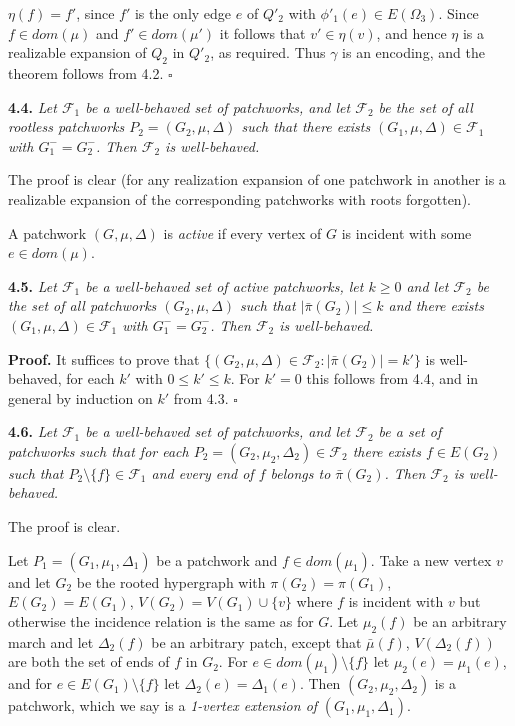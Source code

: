 \noindent $\eta(f) = f'$, since $f'$ is the only edge $e$ of $Q'_2$ with $\phi'_1(e) \in E(\Omega_3)$. Since $f \in dom(\mu)$ and $f' \in dom(\mu')$ it follows that $v' \in \eta(v)$, and hence $\eta$ is a realizable expansion of $Q_2$ in $Q'_2$, as required. Thus $\gamma$ is an encoding, and the theorem follows from 4.2. $\square$

\textbf{4.4.} \textit{Let $\mathcal{F}_1$ be a well-behaved set of patchworks, and let $\mathcal{F}_2$ be the set of all rootless patchworks $P_2 = (G_2, \mu, \Delta)$ such that there exists $(G_1, \mu, \Delta) \in \mathcal{F}_1$ with $G_1^- = G_2^-$. Then $\mathcal{F}_2$ is well-behaved.}

The proof is clear (for any realization expansion of one patchwork in another is a realizable expansion of the corresponding patchworks with roots forgotten).

A patchwork $(G, \mu, \Delta)$ is \textit{active} if every vertex of $G$ is incident with some $e \in dom(\mu)$.

\textbf{4.5.} \textit{Let $\mathcal{F}_1$ be a well-behaved set of active patchworks, let $k \ge 0$ and let $\mathcal{F}_2$ be the set of all patchworks $(G_2, \mu, \Delta)$ such that $|\bar{\pi}(G_2)| \le k$ and there exists $(G_1, \mu, \Delta) \in \mathcal{F}_1$ with $G_1^- = G_2^-$. Then $\mathcal{F}_2$ is well-behaved.}

\textbf{Proof.} It suffices to prove that $\{(G_2, \mu, \Delta) \in \mathcal{F}_2 : |\bar{\pi}(G_2)| = k'\}$ is well-behaved, for each $k'$ with $0 \le k' \le k$. For $k' = 0$ this follows from 4.4, and in general by induction on $k'$ from 4.3. $\square$

\textbf{4.6.} \textit{Let $\mathcal{F}_1$ be a well-behaved set of patchworks, and let $\mathcal{F}_2$ be a set of patchworks such that for each $P_2 = (G_2, \mu_2, \Delta_2) \in \mathcal{F}_2$ there exists $f \in E(G_2)$ such that $P_2 \setminus \{f\} \in \mathcal{F}_1$ and every end of $f$ belongs to $\bar{\pi}(G_2)$. Then $\mathcal{F}_2$ is well-behaved.}

The proof is clear.

Let $P_1 = (G_1, \mu_1, \Delta_1)$ be a patchwork and $f \in dom(\mu_1)$. Take a new vertex $v$ and let $G_2$ be the rooted hypergraph with $\pi(G_2) = \pi(G_1)$, $E(G_2) = E(G_1)$, $V(G_2) = V(G_1) \cup \{v\}$ where $f$ is incident with $v$ but otherwise the incidence relation is the same as for $G$. Let $\mu_2(f)$ be an arbitrary march and let $\Delta_2(f)$ be an arbitrary patch, except that $\bar{\mu}(f)$, $V(\Delta_2(f))$ are both the set of ends of $f$ in $G_2$. For $e \in dom(\mu_1) \setminus \{f\}$ let $\mu_2(e) = \mu_1(e)$, and for $e \in E(G_1) \setminus \{f\}$ let $\Delta_2(e) = \Delta_1(e)$. Then $(G_2, \mu_2, \Delta_2)$ is a patchwork, which we say is a \textit{1-vertex extension of} $(G_1, \mu_1, \Delta_1)$.

